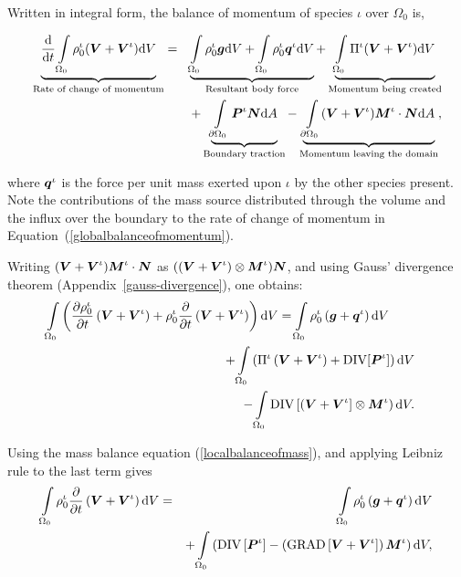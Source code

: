 Written in integral form, the balance of momentum of species $\iota$
over $\Omega_0$ is, 

\begin{eqnarray}
\underbrace{\frac{\mathrm{d}}{\mathrm{d}t} \int\limits_{\Omega_0}
\rho_0^\iota(\mbox{\boldmath$ V$}+\mbox{\boldmath$ V$}^\iota) \mathrm{d}V}_{\text{Rate of change of
    momentum}} &=& \underbrace{\int\limits_{\Omega_0} 
\rho^\iota_0\mbox{\boldmath$ g$} \mathrm{d}V + \int\limits_{\Omega_0}
\rho^\iota_0\mbox{\boldmath$ q$}^\iota \mathrm{d}V}_{\text{Resultant body force}} +
\underbrace{\int\limits_{\Omega_0} 
\Pi^\iota(\mbox{\boldmath$ V$}+\mbox{\boldmath$ V$}^\iota) \mathrm{d}V}_{\text{Momentum
    being created}} \nonumber\\
& &+ \underbrace{\int\limits_{\partial \Omega_0}\mbox{\boldmath$ P$}^\iota\mbox{\boldmath$ N$}
  \mathrm{d}A}_{\text{Boundary traction}} - 
\underbrace{\int\limits_{\partial \Omega_0}(\mbox{\boldmath$ V$}+\mbox{\boldmath$ V$}^\iota)\mbox{\boldmath$ M$}^\iota\cdot\mbox{\boldmath$ N$}
\mathrm{d}A}_{\text{Momentum leaving the domain}},
\label{globalbalanceofmomentum}
\end{eqnarray}

\noindent where $\mbox{\boldmath$ q$}^\iota$ is the force per unit mass exerted upon
$\iota$ by the other species present. Note the contributions of the
mass source distributed through the volume and the influx over the
boundary to the rate of change of momentum in
Equation~(\ref{globalbalanceofmomentum}).

Writing $(\mbox{\boldmath$ V$}+\mbox{\boldmath$ V$}^\iota) \mbox{\boldmath$ M$}^\iota\cdot\mbox{\boldmath$ N$}$ as
$((\mbox{\boldmath$ V$}+\mbox{\boldmath$ V$}^\iota)\otimes\mbox{\boldmath$ M$}^\iota)\mbox{\boldmath$ N$}$, and using Gauss' divergence 
theorem (Appendix~\ref{gauss-divergence}), one obtains:
\begin{eqnarray}
\int\limits_{\Omega_0} \left(\frac{\partial\rho_0^\iota}{\partial
t}\left(\mbox{\boldmath$ V$}+\mbox{\boldmath$ V$}^\iota\right) +
\rho_0^\iota\frac{\partial}{\partial
t}\left(\mbox{\boldmath$ V$}+\mbox{\boldmath$ V$}^\iota\right)\right) \mathrm{d}V =
\int\limits_{\Omega_0}\rho^\iota_0\left(\mbox{\boldmath$ g$}+\mbox{\boldmath$ q$}^\iota\right)\mathrm{d}V\qquad&
&\nonumber\\
+\int\limits_{\Omega_0}\left(\Pi^\iota\left(\mbox{\boldmath$ V$}+\mbox{\boldmath$ V$}^\iota\right) +
\mathrm{\small{DIV}}[\mbox{\boldmath$ P$}^\iota]\right)
\mathrm{d}V& & \nonumber\\
-
\int\limits_{\Omega_0}\mathrm{\small{DIV}}
\left[\left(\mbox{\boldmath$ V$}+\mbox{\boldmath$ V$}^\iota\right]\otimes\mbox{\boldmath$ M$}^\iota\right)\mathrm{d}V .
& &
\end{eqnarray}

\noindent Using the mass balance equation (\ref{localbalanceofmass}),
and applying Leibniz rule to the last term gives
\begin{eqnarray}
\int\limits_{\Omega_0} \rho_0^\iota\frac{\partial}{\partial
t}\left(\mbox{\boldmath$ V$}+\mbox{\boldmath$ V$}^\iota\right) \mathrm{d}V &=&
\int\limits_{\Omega_0}\rho^\iota_0\left(\mbox{\boldmath$ g$}+\mbox{\boldmath$ q$}^\iota\right)
\mathrm{d}V \nonumber\\
& &+
\int\limits_{\Omega_0}\left(\mathrm{\small{DIV}}\left[\mbox{\boldmath$ P$}^\iota\right] -
\left(\mathrm{\small{GRAD}}\left[\mbox{\boldmath$ V$}+\mbox{\boldmath$ V$}^\iota\right]\right)\mbox{\boldmath$ M$}^\iota\right)
\mathrm{d}V,
\end{eqnarray}

